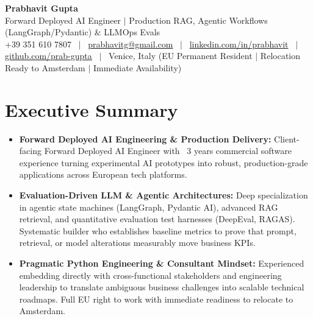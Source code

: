 \documentclass[a4paper,10pt]{article}
\begin{document}
\begin{minipage}[c]{0.80\textwidth}
  {\Huge\bfseries Prabhavit Gupta}\\[3pt]
  {\color{accent}\large Forward Deployed AI Engineer $\vert$ Production RAG, Agentic Workflows (LangGraph/Pydantic) $\&$ LLMOps Evals}\\[6pt]
  {\footnotesize +39 351 610 7807 ~$\vert$~
  \href{mailto:prabhavitg@gmail.com}{prabhavitg@gmail.com} ~$\vert$~
  \href{https://www.linkedin.com/in/prabhavit/}{linkedin.com/in/prabhavit} ~$\vert$~
  \href{https://github.com/prab-gupta}{github.com/prab-gupta} ~$\vert$~
  Venice, Italy (EU Permanent Resident $\vert$ Relocation Ready to Amsterdam $\vert$ Immediate Availability)}
\end{minipage}\hfill

\vspace{6pt}

\section{Executive Summary}
\begin{itemize}
  \item \textbf{Forward Deployed AI Engineering \& Production Delivery:} Client-facing Forward Deployed AI Engineer with ~3 years commercial software experience turning experimental AI prototypes into robust, production-grade applications across European tech platforms.
  \item \textbf{Evaluation-Driven LLM \& Agentic Architectures:} Deep specialization in agentic state machines (LangGraph, Pydantic AI), advanced RAG retrieval, and quantitative evaluation test harnesses (DeepEval, RAGAS). Systematic builder who establishes baseline metrics to prove that prompt, retrieval, or model alterations measurably move business KPIs.
  \item \textbf{Pragmatic Python Engineering \& Consultant Mindset:} Experienced embedding directly with cross-functional stakeholders and engineering leadership to translate ambiguous business challenges into scalable technical roadmaps. Full EU right to work with immediate readiness to relocate to Amsterdam.
\end{itemize}

\end{document}
